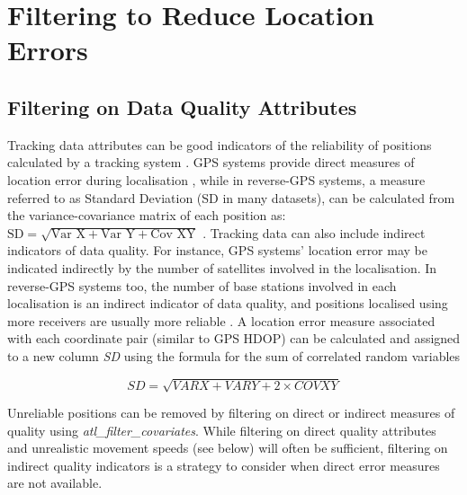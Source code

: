
\section*{Filtering to Reduce Location Errors}

\subsection*{Filtering on Data Quality Attributes}

Tracking data attributes can be good indicators of the reliability of positions calculated by a tracking system \citep{beardsworth2022mee}.
GPS systems provide direct measures of location error during localisation \citep[Horizontal Dilution of Precision, HDOP in GPS]{ranacher2016}, while  in reverse-GPS systems, a measure referred to as Standard Deviation (SD in many datasets), can be calculated from the variance-covariance matrix of each position as: $\text{SD} = \sqrt{\text{Var X} + \text{Var Y} + \text{Cov XY}}$ \citep[see details in][]{maccurdy2009, maccurdy2019, weiser2016, ranacher2016}.
Tracking data can also include indirect indicators of data quality.
For instance, GPS systems' location error may be indicated indirectly by the number of satellites involved in the localisation.
In reverse-GPS systems too, the number of base stations involved in each localisation is an indirect indicator of data quality, and positions localised using more receivers are usually more reliable \citep[the minimum required for an ATLAS localisation is 3; see][]{weiser2016,beardsworth2022mee}.
A location error measure associated with each coordinate pair (similar to GPS HDOP) can be calculated and assigned to a new column \textit{SD} using the formula for the sum of correlated random variables
\begin{linenomath*}
    \begin{equation*}
        SD = \sqrt{{VARX} + {VARY} + 2 \times {COVXY}}
     \end{equation*}
\end{linenomath*}
Unreliable positions can be removed by filtering on direct or indirect measures of quality using \textit{atl\_filter\_covariates}.
While filtering on direct quality attributes and unrealistic movement speeds (see below) will often be sufficient, filtering on indirect quality indicators is a strategy to consider when direct error measures are not available.

